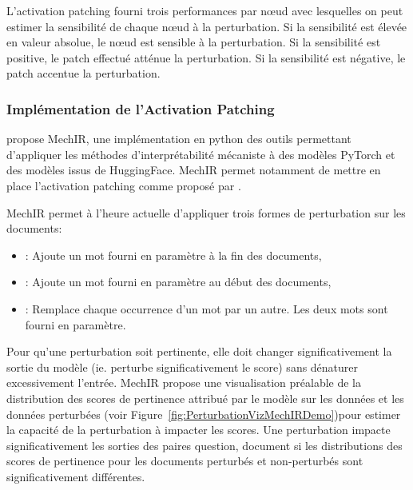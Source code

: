             L'activation patching fourni  trois performances par nœud avec lesquelles on peut estimer la sensibilité de chaque nœud à la perturbation. Si la sensibilité est élevée en valeur absolue, le nœud est sensible à la perturbation. Si la sensibilité est positive, le patch effectué atténue la perturbation. Si la sensibilité est négative, le patch accentue la perturbation. 

        \subsubsection{Implémentation de l'Activation Patching}

            \cite{parry_mechir_2025} propose MechIR, une implémentation en python des outils permettant d'appliquer les méthodes d'interprétabilité mécaniste à des modèles PyTorch et des modèles issus de HuggingFace. MechIR permet notamment de mettre en place l'activation patching comme proposé par \cite{chen_axiomatic_2024}.

            MechIR permet à l'heure actuelle d'appliquer trois formes de perturbation sur les documents:
            \begin{itemize}
                \item \append : Ajoute un mot fourni en paramètre à la fin des documents,
                \item \prepend : Ajoute un mot fourni en paramètre au début des documents,
                \item \replace : Remplace chaque occurrence d'un mot par un autre. Les deux mots sont fourni en paramètre.
            \end{itemize}

            Pour qu'une perturbation soit pertinente, elle doit changer significativement la sortie du modèle (ie. perturbe significativement le score) sans dénaturer excessivement l'entrée. MechIR propose une visualisation préalable de la distribution des scores de pertinence attribué par le modèle sur les données et les données perturbées (voir Figure~\ref{fig:PerturbationVizMechIRDemo})pour estimer la capacité de la perturbation à impacter les scores. Une perturbation impacte significativement les sorties des paires question, document si les distributions des scores de pertinence pour les documents perturbés et non-perturbés sont significativement différentes.
            

